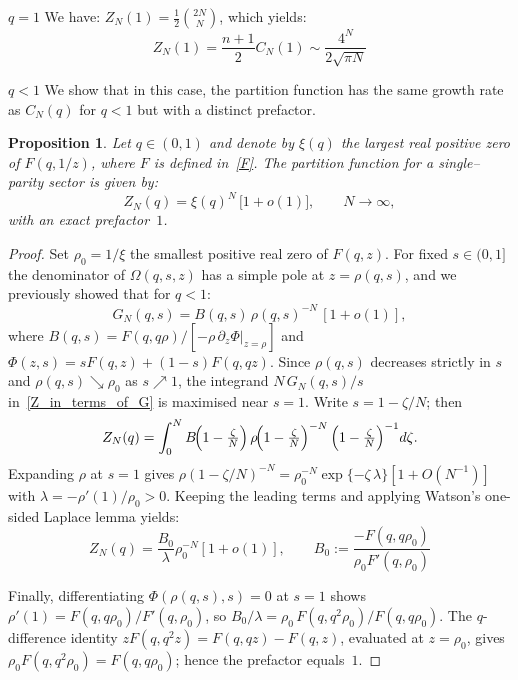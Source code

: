 \documentclass[pdflatex,sn-mathphys-num]{sn-jnl}
\newtheorem{proposition}[theorem]{Proposition}
\theoremstyle{definition}
\theoremstyle{remark}
\numberwithin{equation}{section}
\begin{document}
\noindent
$\boxed{q = 1}$ We have: $Z_N(1) = \frac{1}{2} \binom{2N}{N}$, which yields:
\begin{equation}
    Z_N(1) =  \frac{n+1}{2}C_N(1) \sim {\frac {4^{N}}{{2\sqrt {\pi N }}}}
\end{equation}

\noindent
$\boxed{q < 1}$ We show that in this case, the partition function has the same growth rate as $C_N(q)$ for $q<1$ but with a distinct prefactor. 



\begin{proposition}\label{prop:Zn_q<1}
Let $q \in (0,1)$ and denote by $\xi(q)$ the largest real positive zero of
$F(q,1/z)$, where $F$ is defined in~\eqref{F}. The partition function for a single–parity sector is given by:
\begin{equation}
   Z_N(q)=\xi(q)^N \,\bigl[1+o(1)\bigr],
   \qquad N\to\infty,
   \label{eq:Zn_asymp}
\end{equation}
with an {\it exact} prefactor~$1$.
\end{proposition}

\begin{proof}
Set $\rho_0 = 1/\xi$ the smallest positive real zero of $F(q,z)$.
For fixed $s \in (0,1]$ the denominator of
$\Omega(q,s,z)$ has a simple pole at $z=\rho(q,s)$, and we previously showed that for $q<1$:
\[
   G_N(q,s)=B(q,s)\,\rho(q,s)^{-N}\,[1+o(1)],
\]
where $B(q,s)=F(q,q\rho)/[-\rho\,\partial_z \Phi |_{z=\rho}]$ and
$\Phi(z,s)=sF(q,z)+(1-s)F(q,qz)$.  Since $\rho(q,s)$ decreases strictly in
$s$ and $\rho(q,s)\searrow \rho_0$ as $s\nearrow1$, the integrand
$N\,G_N(q,s)/s$ in~\eqref{Z_in_terms_of_G} is maximised near $s=1$.  
Write $s=1-\zeta/N$; then
\[
   Z_N(q)=
   \int_{0}^{N}
     B\!\Bigl(1-\tfrac{\zeta}{N}\Bigr)\,
     \rho\!\Bigl(1-\tfrac{\zeta}{N}\Bigr)^{-N}\,
     \Bigl(1-\tfrac{\zeta}{N}\Bigr)^{-1} d\zeta .
\]
Expanding $\rho$ at $s=1$ gives
$\rho(1-\zeta/N)^{-N}=\rho_0^{-N}\exp\{- \zeta\,\lambda\}[1+O(N^{-1})]$ with
$\lambda=-\rho'(1)/\rho_0>0$.  Keeping the leading terms and applying
Watson’s one-sided Laplace lemma \cite{de2014asymptotic,wong2001asymptotic} yields:
\begin{equation}
    Z_N(q)=\frac{B_0}{\lambda}\rho_0^{-N}[1+o(1)], \qquad B_0 := \frac{-F(q,q\rho_0)}{\rho_0F'(q,\rho_0)}
\end{equation}

Finally, differentiating $\Phi(\rho(q,s),s)=0$ at $s=1$ shows
$\rho'(1)=F(q,q\rho_0)/F'(q,\rho_0)$, so $B_0/\lambda=
\rho_0\,F(q,q^{2}\rho_0)/F(q,q\rho_0)$.  
The $q$-difference identity
$zF(q,q^{2}z)=F(q,qz)-F(q,z)$, evaluated at $z=\rho_0$, gives
$\rho_0F(q,q^{2}\rho_0)=F(q,q\rho_0)$; hence the prefactor equals~$1$.
\end{proof}
\end{document}
